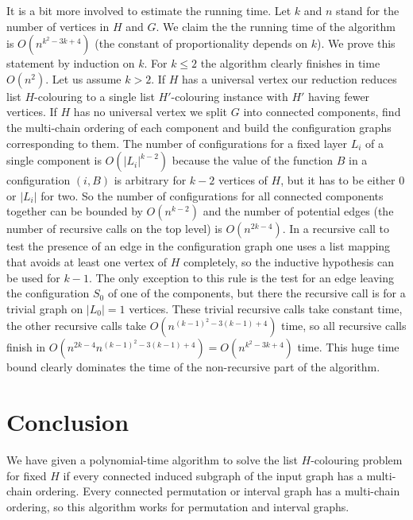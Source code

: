 \documentclass[12pt]{llncs}
\begin{document}
It is a bit more involved to estimate the running time. Let $k$ and $n$ stand
for the number of vertices in $H$ and $G$. We claim the the running time of the
algorithm is $O(n^{k^2-3k+4})$ (the constant of proportionality depends on
$k$). We prove
this statement by induction on $k$. For $k\le 2$ the algorithm clearly
finishes in time $O(n^2)$. Let us assume $k>2$. If $H$ has a universal
vertex our reduction reduces list $H$-colouring to a single list $H'$-colouring
instance with $H'$ having fewer vertices. If $H$ has no universal vertex we
split $G$ into connected components, find the multi-chain ordering of each
component and build the configuration graphs corresponding to them. The
number of configurations for a fixed layer $L_i$ of a single component is
$O(|L_i|^{k-2})$ because the value of the function $B$ in a configuration
$(i,B)$ is arbitrary for $k-2$ vertices of $H$, but it has to be either $0$ or
$|L_i|$ for two. So the number of configurations for all connected components
together can be bounded by $O(n^{k-2})$ and the number of potential edges (the
number of recursive calls on the top level) is $O(n^{2k-4})$. In a
recursive call to test the presence of an edge in the configuration graph one
uses a list mapping that avoids at least one vertex of $H$ completely, so the
inductive hypothesis can be used for $k-1$. The only exception to this
rule is the test for an edge leaving the configuration $S_0$ of one of the
components,  but there the recursive call is for a
trivial graph on $|L_0|=1$ vertices. These trivial recursive calls
take constant time, the other recursive calls take
$O(n^{(k-1)^2-3(k-1)+4})$ time, so all recursive calls finish in
$O(n^{2k-4}n^{(k-1)^2-3(k-1)+4})=O(n^{k^2-3k+4})$ time. This huge time bound
clearly dominates the time of the non-recursive part of the algorithm.

\section{Conclusion}
We have given a polynomial-time algorithm to solve the list $H$-colouring
problem for fixed $H$ if every connected induced subgraph of the input graph
has a multi-chain ordering. Every connected permutation or interval graph has
a multi-chain ordering, so this algorithm works for permutation and interval
graphs.


\end{document}
